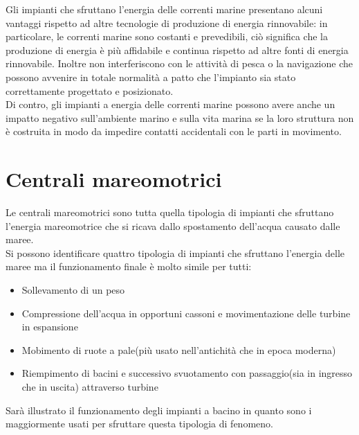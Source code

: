 Gli impianti che sfruttano l'energia delle correnti marine presentano alcuni vantaggi rispetto ad altre tecnologie di produzione di energia rinnovabile: in particolare, le correnti marine sono costanti e prevedibili, ciò significa che la produzione di energia è più affidabile e continua rispetto ad altre fonti di energia rinnovabile.
Inoltre non interferiscono con le attività di pesca o la navigazione che possono avvenire in totale normalità a patto che l'impianto sia stato correttamente progettato e posizionato.\\
Di contro, gli impianti a energia delle correnti marine possono avere anche un impatto negativo sull'ambiente marino e sulla vita marina se la loro struttura non è costruita in modo da impedire contatti accidentali con le parti in movimento.\\
\section{Centrali mareomotrici}
Le centrali mareomotrici sono tutta quella tipologia di impianti che sfruttano l'energia mareomotrice che si ricava dallo spostamento dell'acqua causato dalle maree.\\
Si possono identificare quattro tipologia di impianti che sfruttano l'energia delle maree ma il funzionamento finale è molto simile per tutti:\\
\begin{itemize}
    \item Sollevamento di un peso
    \item Compressione dell'acqua in opportuni cassoni e movimentazione delle turbine in espansione
    \item Mobimento di ruote a pale(più usato nell'antichità che in epoca moderna)
    \item Riempimento di bacini e successivo svuotamento con passaggio(sia in ingresso che in uscita) attraverso turbine
\end{itemize}
Sarà illustrato il funzionamento degli impianti a bacino in quanto sono i maggiormente usati per sfruttare questa tipologia di fenomeno.\\
